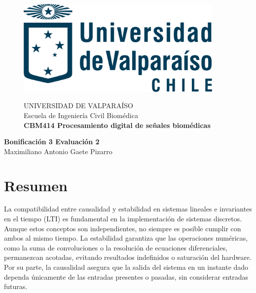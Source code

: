 \documentclass[10pt]{article}
\theoremstyle{definition}
\theoremstyle{remark}
\theoremstyle{definition}
\numberwithin{equation}{prob}
\begin{document}
	
	\begin{titlepage}
		
		
		\begin{figure}
			\begin{minipage}{4cm}
				\includegraphics[width=0.9\textwidth]{./figures/logo}
			\end{minipage}
			\begin{minipage}{11cm}
				\vspace{4mm}
				{\sc UNIVERSIDAD DE VALPARAÍSO}\\
				Escuela de Ingeniería Civil Biomédica\\
				{\bf CBM414 Procesamiento digital de señales biomédicas}\\
				\vspace{0mm}
				\hrulefill
			\end{minipage}
		\end{figure}
		\phantom{""}\vspace{60mm}
		
		
		\begin{center}
			\Huge{\textbf{Bonificación 3 Evaluación 2}}\vspace{95mm}\\
			\raggedleft \Large{Maximiliano Antonio Gaete Pizarro}\\ 
		\end{center}
		
		
	\end{titlepage}
	
\printindex

\section*{Resumen}

La compatibilidad entre causalidad y estabilidad en sistemas lineales e invariantes en el tiempo (LTI) es fundamental en la implementación de sistemas discretos. Aunque estos conceptos son independientes, no siempre es posible cumplir con ambos al mismo tiempo. La estabilidad garantiza que las operaciones numéricas, como la suma de convoluciones o la resolución de ecuaciones diferenciales, permanezcan acotadas, evitando resultados indefinidos o saturación del hardware. Por su parte, la causalidad asegura que la salida del sistema en un instante dado dependa únicamente de las entradas presentes o pasadas, sin considerar entradas futuras.
\end{document}
